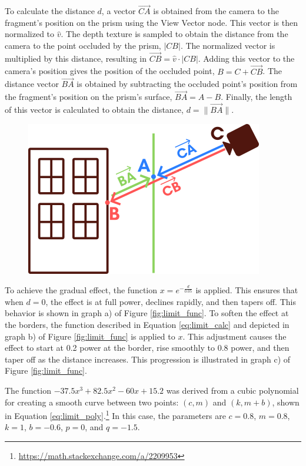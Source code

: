         To calculate the distance \( d \), a vector \(\vec{CA}\) is obtained from the camera to the fragment's position on the prism using the View Vector node. This vector is then normalized to \(\hat{v}\). The depth texture is sampled to obtain the distance from the camera to the point occluded by the prism, \(|CB|\). The normalized vector is multiplied by this distance, resulting in \(\vec{CB} = \hat{v} \cdot |CB|\). Adding this vector to the camera's position gives the position of the occluded point, \( B = C + \vec{CB} \). The distance vector \(\vec{BA}\) is obtained by subtracting the occluded point's position from the fragment's position on the prism's surface, \(\vec{BA} = A - B\). Finally, the length of this vector is calculated to obtain the distance, \( d = \|\vec{BA}\| \).
        
        \begin{figure}[h!]
            \centering
            \includegraphics[width=.5\textwidth]{figures/limit_calc.png}
            \label{fig:limit_calc}
        \end{figure}
    
        To achieve the gradual effect, the function \( x = e^{-\frac{d}{0.05}} \) is applied. This ensures that when \( d = 0 \), the effect is at full power, declines rapidly, and then tapers off. This behavior is shown in graph a) of Figure \ref{fig:limit_func}. To soften the effect at the borders, the function described in Equation \ref{eq:limit_calc} and depicted in graph b) of Figure \ref{fig:limit_func} is applied to \( x \). This adjustment causes the effect to start at 0.2 power at the border, rise smoothly to 0.8 power, and then taper off as the distance increases. This progression is illustrated in graph c) of Figure \ref{fig:limit_func}.

        The function \( -37.5 x^3 + 82.5 x^2 - 60 x + 15.2 \) was derived from a cubic polynomial for creating a smooth curve between two points: \((c, m)\) and \((k, m + b)\), shown in Equation \ref{eq:limit_poly}.\footnote{\url{https://math.stackexchange.com/a/2209953}} In this case, the parameters are \( c = 0.8 \), \( m = 0.8 \), \( k = 1 \), \( b = -0.6 \), \( p = 0 \), and \( q = -1.5 \).

